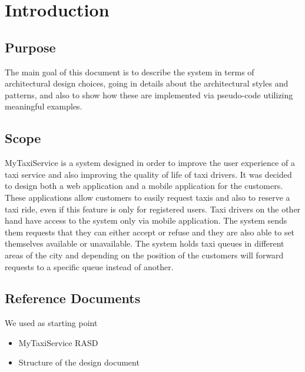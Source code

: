 \section{Introduction}
\subsection{Purpose}
The main goal of this document is to describe the system in terms of architectural design choices, going in details about the architectural styles and patterns, and also to show how these are implemented via pseudo-code utilizing meaningful examples.
\subsection{Scope}
MyTaxiService is a system designed in order to improve the user experience of a taxi service and also improving the quality of life of taxi drivers. It was decided to design both a web application and a mobile application for the customers. These applications allow customers to easily request taxis and also to reserve a taxi ride, even if this feature is only for registered users. Taxi drivers on the other hand have access to the system only via mobile application. The system sends them requests that they can either accept or refuse and they are also able to set themselves available or unavailable. The system holds taxi queues in different areas of the city and depending on the position of the customers will forward requests to a specific queue instead of another.
\subsection{Reference Documents}
We used as starting point 
\begin{itemize}
	\item MyTaxiService RASD
	\item Structure of the design document
\end{itemize}
